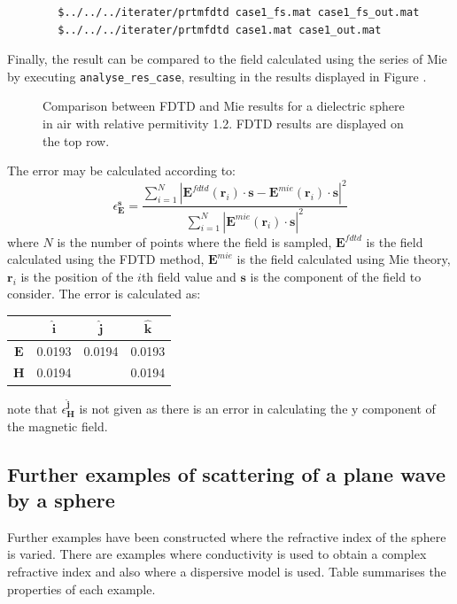\documentclass[a4paper, 12pt]{article}
\begin{document}
	\begin{verbatim}
		$../../../iterater/prtmfdtd case1_fs.mat case1_fs_out.mat
		$../../../iterater/prtmfdtd case1.mat case1_out.mat
	\end{verbatim}
	
	Finally, the result can be compared to the field calculated using the
	series of Mie by executing \verb+analyse_res_case+, resulting in the
	results displayed in Figure .
	
	\begin{figure}[!h]
		\begin{center}
			\caption{Comparison between FDTD and Mie results for a dielectric
				sphere in air with relative permitivity 1.2. FDTD results are
				displayed on the top row.}
		\end{center}
	\end{figure}
	The error may be calculated according to:
	\begin{equation} \label{e:Global-Error-Metric-copy}
		\epsilon_\mathbf{E}^\mathbf{s}=\frac{\sum_{i=1}^{N}|{\mathbf{E}^{fdtd}(\mathbf{r}_{i})\cdot\mathbf{s}-\mathbf{E}^{mie}(\mathbf{r}_{i})\cdot\mathbf{s}}|^{2}}%
		{\sum_{i=1}^{N}|\mathbf{E}^{mie}(\mathbf{r}_{i})\cdot\mathbf{s}|^{2}}
	\end{equation}
	where $N$ is the number of points where the field is
	sampled, $\mathbf{E}^{fdtd}$ is the field calculated using the FDTD method, $\mathbf{E}^{mie}$ is the field
	calculated using Mie theory, $\mathbf{r}_i$ is the position of the
	$i$th field value and $\mathbf{s}$ is the component of the field to
	consider. The error is calculated as:
	\newline
	\begin{table}[hbp]
		\begin{tabular}{|c|c|c|c|}
			\hline
			&$\mathbf{\hat{i}}$&$\mathbf{\hat{j}}$&$\mathbf{\hat{k}}$\\
			\hline
			$\mathbf{E}$&0.0193&    0.0194&    0.0193\\
			$\mathbf{H}$&0.0194&    &    0.0194\\
			\hline
		\end{tabular}
	\end{table}
	note that $\epsilon_\mathbf{H}^\mathbf{\hat{j}}$ is not given as there
	is an error in calculating the y component of the magnetic field.
	\subsection{Further examples of scattering of a plane wave by a
		sphere}
	Further examples have been constructed where the refractive index of
	the sphere is varied. There are examples where conductivity is used to
	obtain a complex refractive index and also where a dispersive model is
	used. Table summarises the properties of each example.
	
\end{document}
